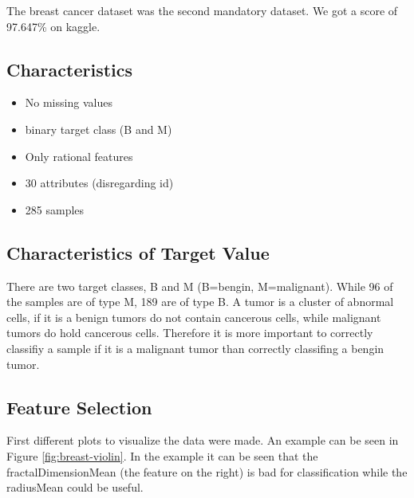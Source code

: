 The breast cancer dataset was the second mandatory dataset. We got a score of 97.647\% on kaggle.

\subsection{Characteristics}

\begin{itemize}
\item No missing values
\item binary target class (B and M)
\item Only rational features
\item 30 attributes (disregarding id)
\item 285 samples
\end{itemize}


\subsection{Characteristics of Target Value}

There are two target classes, B and M (B=bengin, M=malignant). While 96 of the samples are of type M, 189 are of type B. A tumor is a cluster of abnormal cells, if it is a benign tumors do not contain cancerous cells, while malignant tumors do hold cancerous cells. Therefore it is more important to correctly classifiy a sample if it is a malignant tumor than correctly classifing a bengin tumor.




\subsection{Feature Selection}
First different plots to visualize the data were made. An example can be seen in Figure \ref{fig:breast-violin}. In the example it can be seen that the fractalDimensionMean (the feature on the right) is bad for classification while the radiusMean could be useful.


